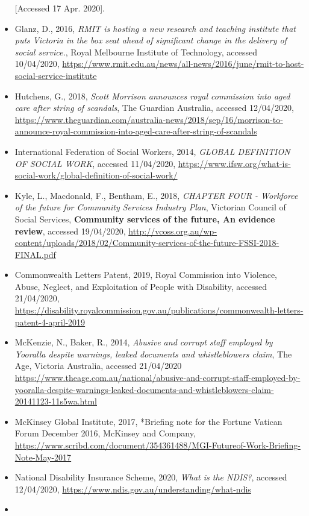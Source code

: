 \documentclass[11pt,]{article}
\begin{document}
\begin{itemize}
  {[}Accessed 17 Apr. 2020{]}.
\item
  Glanz, D., 2016, \emph{RMIT is hosting a new research and teaching
  institute that puts Victoria in the box seat ahead of significant
  change in the delivery of social service.}, Royal Melbourne Institute
  of Technology, accessed 10/04/2020,
  \url{https://www.rmit.edu.au/news/all-news/2016/june/rmit-to-host-social-service-institute}
\item
  Hutchens, G., 2018, \emph{Scott Morrison announces royal commission
  into aged care after string of scandals}, The Guardian Australia,
  accessed 12/04/2020,
  \url{https://www.theguardian.com/australia-news/2018/sep/16/morrison-to-announce-royal-commission-into-aged-care-after-string-of-scandals}
\item
  International Federation of Social Workers, 2014, \emph{GLOBAL
  DEFINITION OF SOCIAL WORK}, accessed 11/04/2020,
  \url{https://www.ifsw.org/what-is-social-work/global-definition-of-social-work/}
\item
  Kyle, L., Macdonald, F., Bentham, E., 2018, \emph{CHAPTER FOUR -
  Workforce of the future for Community Services Industry Plan},
  Victorian Council of Social Services, \textbf{Community services of
  the future, An evidence review}, accessed 19/04/2020,
  \url{http://vcoss.org.au/wp-content/uploads/2018/02/Community-services-of-the-future-FSSI-2018-FINAL.pdf}
\item
  Commonwealth Letters Patent, 2019, Royal Commission into Violence,
  Abuse, Neglect, and Exploitation of People with Disability, accessed
  21/04/2020,
  \url{https://disability.royalcommission.gov.au/publications/commonwealth-letters-patent-4-april-2019}
\item
  McKenzie, N., Baker, R., 2014, \emph{Abusive and corrupt staff
  employed by Yooralla despite warnings, leaked documents and
  whistleblowers claim}, The Age, Victoria Australia, accessed
  21/04/2020
  \url{https://www.theage.com.au/national/abusive-and-corrupt-staff-employed-by-yooralla-despite-warnings-leaked-documents-and-whistleblowers-claim-20141123-11s5wa.html}
\item
  McKinsey Global Institute, 2017, *Briefing note for the Fortune
  Vatican Forum December 2016, McKinsey and Company,
  \url{https://www.scribd.com/document/354361488/MGI-Futureof-Work-Briefing-Note-May-2017}
\item
  National Disability Insurance Scheme, 2020, \emph{What is the NDIS?},
  accessed 12/04/2020,
  \url{https://www.ndis.gov.au/understanding/what-ndis}
\item

\end{itemize}
\end{document}
